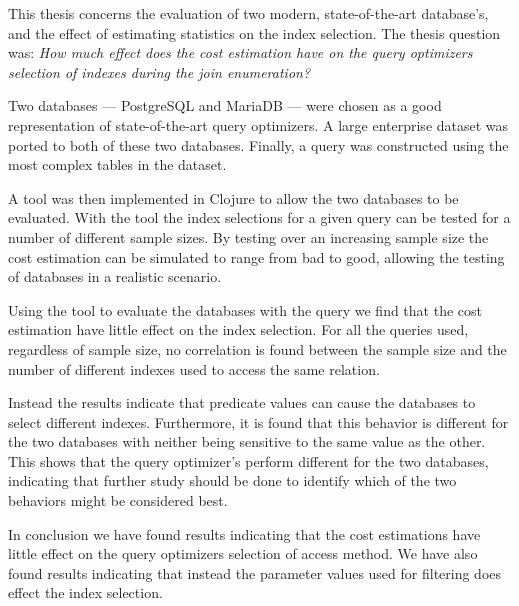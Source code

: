 This thesis concerns the evaluation of two modern, state-of-the-art database's,
and the effect of estimating statistics on the index selection. The thesis question was:
\textit{How much effect does the cost estimation have on the query optimizers selection of indexes during the join enumeration?}

Two databases --- PostgreSQL and MariaDB --- were chosen as a good representation of
state-of-the-art query optimizers. A large enterprise dataset was ported to both
of these two databases. Finally, a query was constructed using the most complex
tables in the dataset.

A tool was then implemented in Clojure to allow the two databases to be
evaluated. With the tool the index selections for a given query can be tested
for a number of different sample sizes. By testing over an increasing sample
size the cost estimation can be simulated to range from bad to good, allowing
the testing of databases in a realistic scenario.

Using the tool to evaluate the databases with the query we find that the cost
estimation have little effect on the index selection. For all the queries used,
regardless of sample size, no correlation is found between the sample size and
the number of different indexes used to access the same relation.

Instead the results indicate that predicate values can cause the databases to
select different indexes. Furthermore, it is found that this behavior is
different for the two databases with neither being sensitive to the same value
as the other. This shows that the query optimizer's perform different for the
two databases, indicating that further study should be done to identify which of
the two behaviors might be considered best.

In conclusion we have found results indicating that the cost estimations have
little effect on the query optimizers selection of access method. We have also found
results indicating that instead the parameter values used for filtering does
effect the index selection.
